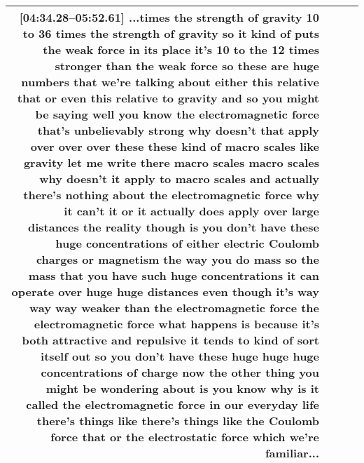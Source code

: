 \documentclass[10pt]{article}
\begin{document}
\begin{tiny}
\begin{longtable}{|r|p{0.375in}|p{1.275in}|p{3.5in}|}
                                                                                                                                                                                                                                                                                                                                                                                                                                                                                   \textbf{[04:34.28--05:52.61]} ...times the strength of gravity 10 to 36 times the strength of gravity so it kind of puts the weak force in its place it's 10 to the 12 times stronger than the weak force so these are huge numbers that we're talking about either this relative that or even this relative to gravity and so you might be saying well you know the electromagnetic force that's unbelievably strong why doesn't that apply over over over these these kind of macro scales like gravity let me write there macro scales macro scales why doesn't it apply to macro scales and actually there's nothing about the electromagnetic force why it can't it or it actually does apply over large distances the reality though is you don't have these huge concentrations of either electric Coulomb charges or magnetism the way you do mass so the mass that you have such huge concentrations it can operate over huge huge distances even though it's way way way weaker than the electromagnetic force the electromagnetic force what happens is because it's both attractive and repulsive it tends to kind of sort itself out so you don't have these huge huge huge concentrations of charge now the other thing you might be wondering about is you know why is it called the electromagnetic force in our everyday life there's things like there's things like the Coulomb force that or the electrostatic force which we're familiar... \\\hline

\end{longtable}
\end{tiny}
\end{document}
